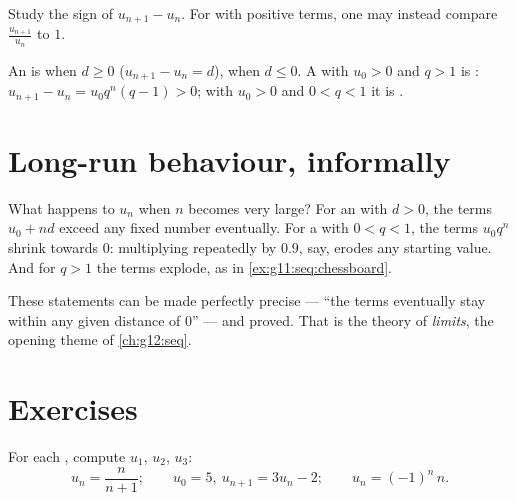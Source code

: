 \begin{method}\label{met:g11:seq:monotonicity}
Study the sign of $u_{n+1} - u_n$. For  with positive terms, one
may instead compare $\frac{u_{n+1}}{u_n}$ to $1$.
\end{method}

\begin{example}
An  is  when $d \geq 0$
($u_{n+1} - u_n = d$),  when $d \leq 0$. A 
with $u_0 > 0$ and $q > 1$ is :
$u_{n+1} - u_n = u_0 q^n (q - 1) > 0$; with $u_0 > 0$ and $0 < q < 1$ it
is .
\end{example}

\section{Long-run behaviour, informally}

What happens to $u_n$ when $n$ becomes very large? For an  with $d > 0$, the terms $u_0 + nd$ exceed any fixed number
eventually. For a  with $0 < q < 1$, the terms
$u_0 q^n$ shrink towards $0$: multiplying repeatedly by $0.9$, say, erodes
any starting value. And for $q > 1$ the terms explode, as in
\cref{ex:g11:seq:chessboard}.

\begin{remark}
These statements can be made perfectly precise --- ``the terms eventually
stay within any given distance of $0$'' --- and proved. That is the theory
of \emph{limits}, the opening theme of \cref{ch:g12:seq}.
\end{remark}

\section{Exercises}

\begin{exercise}[$\star$]\label{exo:g11:seq:1}
For each , compute $u_1$, $u_2$, $u_3$:
\[
u_n = \frac{n}{n+1}; \qquad
u_0 = 5,\ u_{n+1} = 3u_n - 2; \qquad
u_n = (-1)^n\,n .
\]
\end{exercise}

